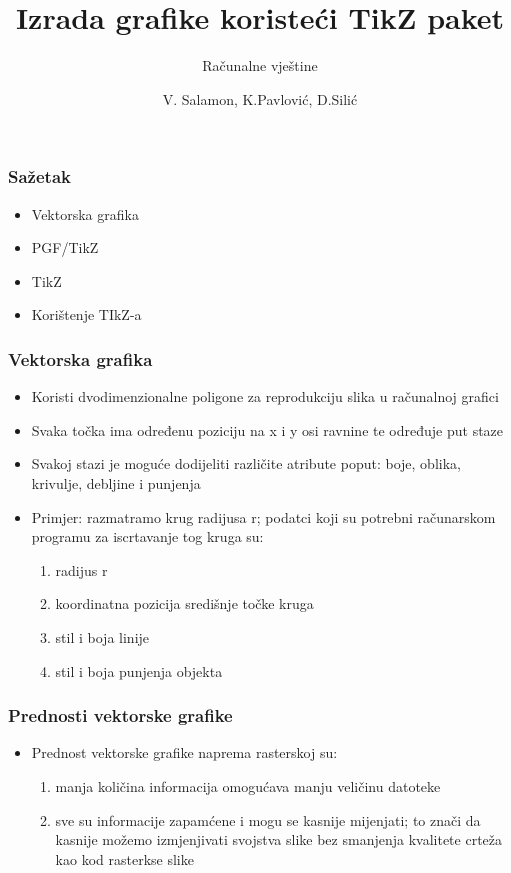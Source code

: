 \documentclass{beamer}
\title[TikZ paket]{Izrada grafike koristeći TikZ paket}
\subtitle{Računalne vještine}
\author{V. Salamon, K.Pavlović, D.Silić}
\date
\begin{document}
	\begin{frame}
	\titlepage
	\end{frame}

	\begin{frame}
	\frametitle{Sažetak}
		\begin{itemize}
			\item Vektorska grafika
			\item PGF/TikZ
			\item TikZ
			\item Korištenje TIkZ-a
		\end{itemize}	
	\end{frame}

	\begin{frame}
	\frametitle{Vektorska grafika}
		\begin{itemize}
			\item Koristi dvodimenzionalne poligone za reprodukciju slika u računalnoj grafici
			\item Svaka točka ima određenu poziciju na x i y osi ravnine te određuje put staze
			\item Svakoj stazi je moguće dodijeliti različite atribute poput: boje, oblika, krivulje, debljine i punjenja
			\item Primjer: razmatramo krug radijusa r; podatci koji su potrebni računarskom programu za iscrtavanje tog kruga su:
			\begin{enumerate}
			\item radijus r
			\item koordinatna pozicija središnje točke kruga
			\item stil i boja linije
			\item stil i boja punjenja objekta
			\end{enumerate}	
		\end{itemize}
	\end{frame}

	\begin{frame}
	\frametitle{Prednosti vektorske grafike}
	\begin{itemize}
		\item Prednost vektorske grafike naprema rasterskoj su:
		\begin{enumerate}
		\item manja količina informacija omogućava manju veličinu datoteke
		\item  sve su informacije zapamćene i mogu se kasnije mijenjati; 
    	to znači da kasnije možemo izmjenjivati svojstva slike
    	bez smanjenja kvalitete crteža kao kod rasterkse slike
		\end{enumerate}	
		\end{itemize}
	\end{frame}
\end{document}
